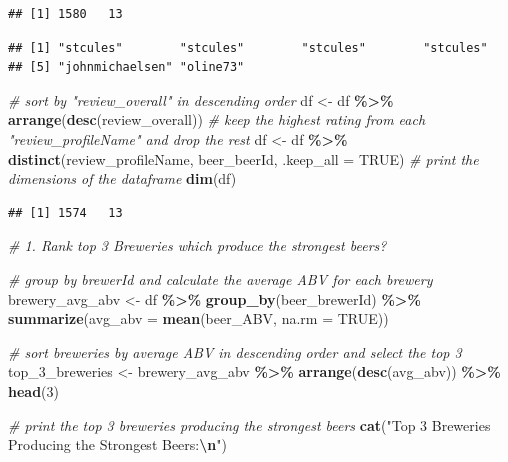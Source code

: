 \documentclass[
  a4paper,
]{article}
\newenvironment{Shaded}{\begin{snugshade}}{\end{snugshade}}
\newcommand{\AttributeTok}[1]{\textcolor[rgb]{0.13,0.29,0.53}{#1}}
\newcommand{\CommentTok}[1]{\textcolor[rgb]{0.56,0.35,0.01}{\textit{#1}}}
\newcommand{\ConstantTok}[1]{\textcolor[rgb]{0.56,0.35,0.01}{#1}}
\newcommand{\DecValTok}[1]{\textcolor[rgb]{0.00,0.00,0.81}{#1}}
\newcommand{\FunctionTok}[1]{\textcolor[rgb]{0.13,0.29,0.53}{\textbf{#1}}}
\newcommand{\NormalTok}[1]{#1}
\newcommand{\OtherTok}[1]{\textcolor[rgb]{0.56,0.35,0.01}{#1}}
\newcommand{\SpecialCharTok}[1]{\textcolor[rgb]{0.81,0.36,0.00}{\textbf{#1}}}
\newcommand{\StringTok}[1]{\textcolor[rgb]{0.31,0.60,0.02}{#1}}
\begin{document}
\begin{verbatim}
## [1] 1580   13
\end{verbatim}

\begin{Shaded}
\end{Shaded}

\begin{verbatim}
## [1] "stcules"        "stcules"        "stcules"        "stcules"       
## [5] "johnmichaelsen" "oline73"
\end{verbatim}

\begin{Shaded}
\begin{Highlighting}[]
\CommentTok{\# sort by "review\_overall" in descending order}
\NormalTok{df }\OtherTok{\textless{}{-}}\NormalTok{ df }\SpecialCharTok{\%\textgreater{}\%} \FunctionTok{arrange}\NormalTok{(}\FunctionTok{desc}\NormalTok{(review\_overall))}
\CommentTok{\# keep the highest rating from each "review\_profileName" and drop the rest}
\NormalTok{df }\OtherTok{\textless{}{-}}\NormalTok{ df }\SpecialCharTok{\%\textgreater{}\%} \FunctionTok{distinct}\NormalTok{(review\_profileName, beer\_beerId, }\AttributeTok{.keep\_all =} \ConstantTok{TRUE}\NormalTok{)}
\CommentTok{\# print the dimensions of the dataframe}
\FunctionTok{dim}\NormalTok{(df)}
\end{Highlighting}
\end{Shaded}

\begin{verbatim}
## [1] 1574   13
\end{verbatim}

\begin{Shaded}
\begin{Highlighting}[]
\CommentTok{\# 1. Rank top 3 Breweries which produce the strongest beers?}

\CommentTok{\# group by brewerId and calculate the average ABV for each brewery}
\NormalTok{brewery\_avg\_abv }\OtherTok{\textless{}{-}}\NormalTok{ df }\SpecialCharTok{\%\textgreater{}\%}
\FunctionTok{group\_by}\NormalTok{(beer\_brewerId) }\SpecialCharTok{\%\textgreater{}\%}
\FunctionTok{summarize}\NormalTok{(}\AttributeTok{avg\_abv =} \FunctionTok{mean}\NormalTok{(beer\_ABV, }\AttributeTok{na.rm =} \ConstantTok{TRUE}\NormalTok{))}

\CommentTok{\# sort breweries by average ABV in descending order and select the top 3}
\NormalTok{top\_3\_breweries }\OtherTok{\textless{}{-}}\NormalTok{ brewery\_avg\_abv }\SpecialCharTok{\%\textgreater{}\%}
\FunctionTok{arrange}\NormalTok{(}\FunctionTok{desc}\NormalTok{(avg\_abv)) }\SpecialCharTok{\%\textgreater{}\%}
\FunctionTok{head}\NormalTok{(}\DecValTok{3}\NormalTok{)}

\CommentTok{\# print the top 3 breweries producing the strongest beers}
\FunctionTok{cat}\NormalTok{(}\StringTok{"Top 3 Breweries Producing the Strongest Beers:}\SpecialCharTok{\textbackslash{}n}\StringTok{"}\NormalTok{)}
\end{Highlighting}
\end{Shaded}
\end{document}
